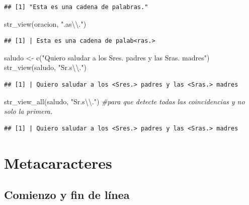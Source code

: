 \documentclass[
]{book}
\newenvironment{Shaded}{\begin{snugshade}}{\end{snugshade}}
\newcommand{\CommentTok}[1]{\textcolor[rgb]{0.56,0.35,0.01}{\textit{#1}}}
\newcommand{\FunctionTok}[1]{\textcolor[rgb]{0.00,0.00,0.00}{#1}}
\newcommand{\NormalTok}[1]{#1}
\newcommand{\OtherTok}[1]{\textcolor[rgb]{0.56,0.35,0.01}{#1}}
\newcommand{\SpecialCharTok}[1]{\textcolor[rgb]{0.00,0.00,0.00}{#1}}
\newcommand{\StringTok}[1]{\textcolor[rgb]{0.31,0.60,0.02}{#1}}
\begin{document}
\begin{verbatim}
## [1] "Esta es una cadena de palabras."
\end{verbatim}

\begin{Shaded}
\begin{Highlighting}[]
\FunctionTok{str\_view}\NormalTok{(oracion, }\StringTok{".as}\SpecialCharTok{\textbackslash{}\textbackslash{}}\StringTok{."}\NormalTok{)}
\end{Highlighting}
\end{Shaded}

\begin{verbatim}
## [1] | Esta es una cadena de palab<ras.>
\end{verbatim}

\begin{Shaded}
\begin{Highlighting}[]
\NormalTok{saludo }\OtherTok{\textless{}{-}} \FunctionTok{c}\NormalTok{(}\StringTok{"Quiero saludar a los Sres. padres y las Sras. madres"}\NormalTok{)}
\FunctionTok{str\_view}\NormalTok{(saludo, }\StringTok{"Sr.s}\SpecialCharTok{\textbackslash{}\textbackslash{}}\StringTok{."}\NormalTok{)}
\end{Highlighting}
\end{Shaded}

\begin{verbatim}
## [1] | Quiero saludar a los <Sres.> padres y las <Sras.> madres
\end{verbatim}

\begin{Shaded}
\begin{Highlighting}[]
\FunctionTok{str\_view\_all}\NormalTok{(saludo, }\StringTok{"Sr.s}\SpecialCharTok{\textbackslash{}\textbackslash{}}\StringTok{."}\NormalTok{) }\CommentTok{\#para que detecte todas las coincidencias y no solo la primera.}
\end{Highlighting}
\end{Shaded}

\begin{verbatim}
## [1] | Quiero saludar a los <Sres.> padres y las <Sras.> madres
\end{verbatim}

\hypertarget{metacaracteres}{%
\section{Metacaracteres}\label{metacaracteres}}

\hypertarget{comienzo-y-fin-de-luxednea}{%
\subsection{Comienzo y fin de línea}\label{comienzo-y-fin-de-luxednea}}
\end{document}
